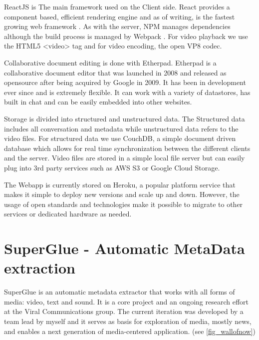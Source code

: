 ReactJS is The main framework used on the Client side. React provides a component based, efficient rendering engine and as of writing, is the fastest growing web framework \cite{reactjs}. As with the server, NPM manages dependencies although the build process is managed by Webpack \cite{webpack}. For video playback we use the HTML5 <video> tag and for video encoding, the open VP8\cite{vp8} codec. 

Collaborative document editing is done with Etherpad\cite{etherpad}. Etherpad is a collaborative document editor that was launched in 2008 and released as opensource after being acquired by Google in 2009. It has been in development ever since and is extremely flexible. It can work with a variety of datastores, has built in chat and can be easily embedded into other websites.

Storage is divided into structured and unstructured data. The Structured data includes all conversation and metadata while unstructured data refers to the video files. For structured data we use CouchDB\cite{couchdb}, a simple document driven database which allows for real time synchronization between the different clients and the server.  Video files are stored in a simple local file server but can easily plug into 3rd party services such as AWS S3 or Google Cloud Storage.

The Webapp is currently stored on Heroku\cite{heroku}, a popular platform service that makes it simple to deploy new versions and scale up and down. However, the usage of open standards and technologies make it possible to migrate to other services or dedicated hardware as needed. 

\section{SuperGlue - Automatic MetaData extraction}
SuperGlue is an automatic metadata extractor that works with all forms of media: video, text and sound. It is a core project and an ongoing research effort at the Viral Communications group. The current iteration was developed by a team lead by myself and it serves as basis for exploration of media, mostly news, and enables a next generation of media-centered application. (see \autoref{fig_wallofnow})

